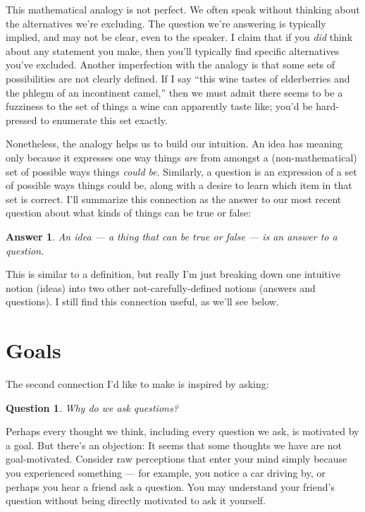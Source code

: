 \documentclass[9pt, twoside]{book}
\newtheorem*{answer}{Answer}
\newtheorem*{question*}{Question}
\theoremstyle{argtstyle}
\begin{document}
This mathematical analogy is not perfect.
We often speak without thinking about the
alternatives we're excluding.
The question we're answering
is typically implied, and may not be clear, even to
the speaker.
I claim that if you {\em did} think about any statement
you
make, then
you'll typically find specific alternatives you've excluded.
Another imperfection with the analogy is that some sets of possibilities are not
clearly defined.
If I say ``this wine tastes of
elderberries and the phlegm of an incontinent camel,'' then we must admit there
seems to be a fuzziness to the set of things a wine can apparently taste like;
you'd be hard-pressed to enumerate this set exactly.

Nonetheless, the analogy helps us to build our intuition.
An idea has meaning only because it expresses one way things
{\em are} from amongst a
(non-mathematical) set of possible ways things {\em could be}.
Similarly, a question is an expression of a set of possible ways things could
be, along with a desire to learn which item in that set is correct.
I'll summarize this
connection as the answer to our most recent question about what
kinds of things can be true or false:
\begin{answer}
An idea --- a thing that can be true or false --- is an answer to a question.
\end{answer}

This is similar to a definition, but really I'm just breaking down
one intuitive notion (ideas) into two other not-carefully-defined notions
(answers and questions). I still find this connection useful, as we'll see
below.

\section{Goals}

The second connection I'd like to make is inspired by asking:
\begin{question*}
    Why do we ask questions?
\end{question*}

Perhaps every thought we think, including every question we ask,
is motivated by a goal.
But there's an objection: It seems that some thoughts
we have are not goal-motivated.
Consider raw perceptions that enter your mind simply because
you experienced something --- for example, you notice a car driving by,
or perhaps you hear a friend ask a question. You may understand
your friend's question without being directly motivated to ask it yourself.
\end{document}
